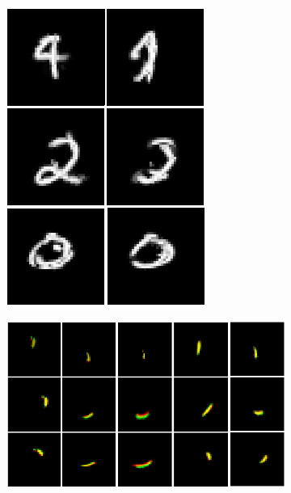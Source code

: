 \begin{figure}
\begin{subfigure}[c]{.059\linewidth}
        \caption{}
    \end{subfigure}
    \hfill
    \begin{subfigure}[c]{.18\linewidth}
        \includegraphics[width=\linewidth]{figures/SCA/mnist/caps_recs}
        \caption{}
    \end{subfigure}
    \hfill
    \begin{subfigure}[c]{.45\linewidth}
        \includegraphics[width=\linewidth]{figures/SCA/mnist/transformed_templates}

\end{subfigure}
\end{figure}
